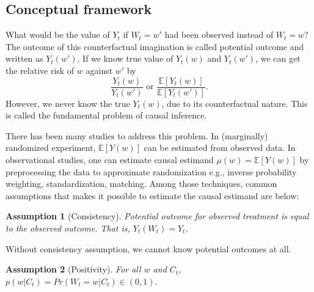 \documentclass[12pt]{article}
\newtheorem{asm}{Assumption}
\begin{document}
\subsection{Conceptual framework}

What would be the value of $Y_t$ if $W_t = w'$ had been observed instead of $W_t = w$?
The outcome of this counterfactual imagination is called potential outcome and written as $Y_t(w')$.
If we know true value of $Y_t(w)$ and $Y_t(w')$, we can get the relative risk of $w$ against $w'$ by
\[
	\frac{Y_t(w)}{Y_t(w')} \text{ or } 
	\frac{\mathbb{E}\left[ Y_t(w) \right]}{\mathbb{E}\left[ Y_t(w') \right]}.
\]
However, we never know the true $Y_t(w)$, due to its counterfactual nature.
This is called the fundamental problem of causal inference\cite{holland1986}.

There has been many studies to address this problem.
In (marginally) randomized experiment, 
$\mathbb{E}[Y(w)]$ can be estimated from observed data\cite{rubin1974}.
In observational studies, 
one can estimate causal estimand $\mu(w) = \mathbb{E}[Y(w)]$ by preprocessing the data to approximate randomization 
e.g., inverse probability weighting, standardization, matching.\cite{rosenbaum1983}
Among those techniques, 
common assumptions that makes it possible to estimate the causal estimand are below:

\begin{asm}[Consistency]\hfill

	Potential outcome for observed treatment is equal to the observed outcome.
	That is, $Y_t(W_t) = Y_t$.
\end{asm}
Without consistency assumption, we cannot know potential outcomes at all.

\begin{asm}[Positivity]\hfill

	For all $w$ and $C_t$, $p(w\lvert C_t) = Pr\left ( W_t = w \lvert C_t\right ) \in (0, 1)$.
\end{asm}
\end{document}
